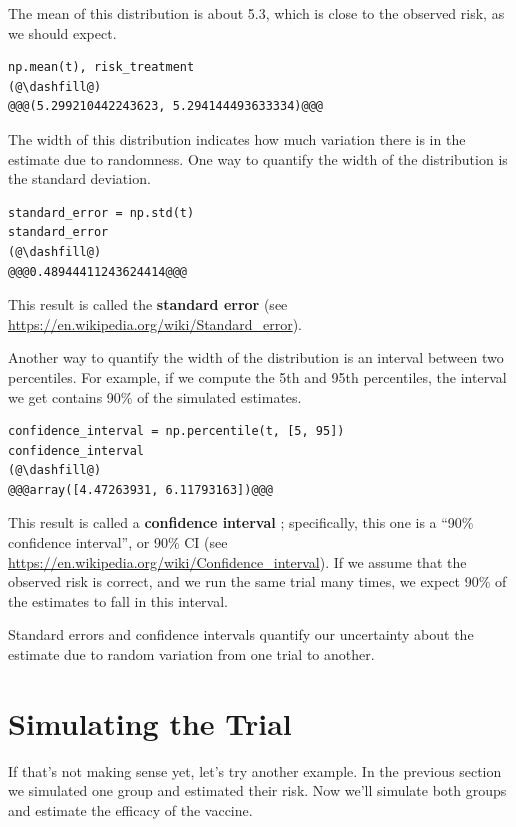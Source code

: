 The mean of this distribution is about 5.3, which is close to the
observed risk, as we should expect.

\begin{lstlisting}[]
np.mean(t), risk_treatment
(@\dashfill@)
@@@(5.299210442243623, 5.294144493633334)@@@
\end{lstlisting}

The width of this distribution indicates how much variation there is in
the estimate due to randomness. One way to quantify the width of the
distribution is the standard deviation.

\begin{lstlisting}[]
standard_error = np.std(t)
standard_error
(@\dashfill@)
@@@0.48944411243624414@@@
\end{lstlisting}

This result is called the \textbf{standard error} (see
\url{https://en.wikipedia.org/wiki/Standard_error}).

Another way to quantify the width of the distribution is an interval
between two percentiles. For example, if we compute the 5th and 95th
percentiles, the interval we get contains 90\% of the simulated
estimates.

\begin{lstlisting}[]
confidence_interval = np.percentile(t, [5, 95])
confidence_interval
(@\dashfill@)
@@@array([4.47263931, 6.11793163])@@@
\end{lstlisting}

This result is called a \textbf{confidence interval} ; specifically,
this one is a ``90\% confidence interval'', or 90\% CI (see
\url{https://en.wikipedia.org/wiki/Confidence_interval}). If we assume
that the observed risk is correct, and we run the same trial many times,
we expect 90\% of the estimates to fall in this interval.

Standard errors and confidence intervals quantify our uncertainty about
the estimate due to random variation from one trial to another.

\hypertarget{simulating-the-trial}{%
\section{Simulating the Trial}\label{simulating-the-trial}}

If that's not making sense yet, let's try another example. In the
previous section we simulated one group and estimated their risk. Now
we'll simulate both groups and estimate the efficacy of the vaccine.

